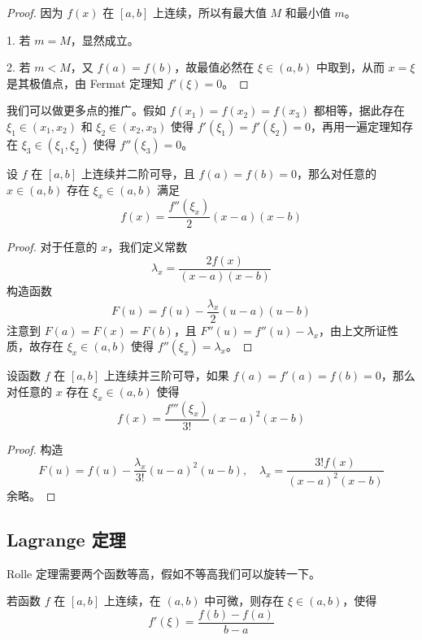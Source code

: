 \begin{proof}
	因为 $f(x)$ 在 $[a,b]$ 上连续，所以有最大值 $M$ 和最小值 $m$。

	1. 若 $m=M$，显然成立。

	2. 若 $m < M$，又 $f(a) = f(b)$，故最值必然在 $\xi \in (a, b)$ 中取到，从而 $x=\xi$ 是其极值点，由 Fermat 定理知 $f'(\xi) = 0$。
\end{proof}

我们可以做更多点的推广。假如 $f(x_1) = f(x_2) = f(x_3)$ 都相等，据此存在 $\xi_1 \in (x_1, x_2)$ 和 $\xi_2 \in (x_2, x_3)$ 使得 $f'(\xi_1) = f'(\xi_2) = 0$，再用一遍定理知存在 $\xi_3 \in (\xi_1, \xi_2)$ 使得 $f''(\xi_3) = 0$。

\begin{example}
	设 $f$ 在 $[a,b]$ 上连续并二阶可导，且 $f(a) = f(b) = 0$，那么对任意的 $x \in (a, b)$ 存在 $\xi_x \in (a,b)$ 满足
	\[ f(x) = \frac{f''(\xi_x)}{2}(x-a)(x-b) \]
\end{example}

\begin{proof}
	对于任意的 $x$，我们定义常数
	\[ \lambda_x = \frac{2 f(x)}{(x - a)(x - b)} \]
	构造函数
	\[ F(u) = f(u) - \frac{\lambda_x}{2} (u-a)(u-b) \]
	注意到 $F(a) = F(x) = F(b)$，且 $F''(u) = f''(u) - \lambda_x$，由上文所证性质，故存在 $\xi_x \in (a, b)$ 使得 $f''(\xi_x) = \lambda_x$。
\end{proof}

\begin{example}
	设函数 $f$ 在 $[a,b]$ 上连续并三阶可导，如果 $f(a) = f'(a) = f(b) = 0$，那么对任意的 $x$ 存在 $\xi_x \in (a, b)$ 使得
	\[ f(x) = \frac{f'''(\xi_x)}{3!} (x-a)^2(x-b) \]
\end{example}

\begin{proof}
	构造
	\[ F(u) = f(u) - \frac{\lambda_x}{3!}(u-a)^2(u-b), \quad \lambda_x = \frac{3! f(x)}{(x-a)^2(x-b)} \]
	余略。
\end{proof}


\subsection{Lagrange 定理}

Rolle 定理需要两个函数等高，假如不等高我们可以旋转一下。

\begin{theorem}[Lagrange 定理]
	若函数 $f$ 在 $[a,b]$ 上连续，在 $(a,b)$ 中可微，则存在 $\xi\in(a,b)$，使得
	\[ f'(\xi)=\frac{f(b)-f(a)}{b-a} \]
\end{theorem}

